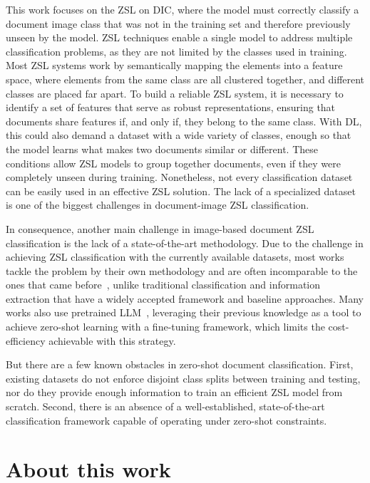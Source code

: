 This work focuses on the \gls{ZSL} on \gls{DIC}, where the model must correctly classify a document image class that was not in the training set and therefore previously unseen by the model. \gls{ZSL} techniques enable a single model to address multiple classification problems, as they are not limited by the classes used in training. Most \gls{ZSL} systems work by semantically mapping the elements into a feature space, where elements from the same class are all clustered together, and different classes are placed far apart. To build a reliable \gls{ZSL} system, it is necessary to identify a set of features that serve as robust representations, ensuring that documents share features if, and only if, they belong to the same class. With \gls{DL}, this could also demand a dataset with a wide variety of classes, enough so that the model learns what makes two documents similar or different. These conditions allow \gls{ZSL} models to group together documents, even if they were completely unseen during training. Nonetheless, not every classification dataset can be easily used in an effective \gls{ZSL} solution. The lack of a specialized dataset is one of the biggest challenges in document-image \gls{ZSL} classification.

In consequence, another main challenge in image-based document \gls{ZSL} classification is the lack of a state-of-the-art methodology. Due to the challenge in achieving \gls{ZSL} classification with the currently available datasets, most works tackle the problem by their own methodology and are often incomparable to the ones that came before~\cite{sinha_cica_2024}, unlike traditional classification and information extraction that have a widely accepted framework and baseline approaches. Many works also use pretrained \gls{LLM}~\cite{scius-bertrand_zero-shot_2025}, leveraging their previous knowledge as a tool to achieve zero-shot learning with a fine-tuning framework, which limits the cost-efficiency achievable with this strategy.

But there are a few known obstacles in zero-shot document classification. First, existing datasets do not enforce disjoint class splits between training and testing, nor do they provide enough information to train an efficient \gls{ZSL} model from scratch. Second, there is an absence of a well-established, state-of-the-art classification framework capable of operating under zero-shot constraints.

\section{About this work}

